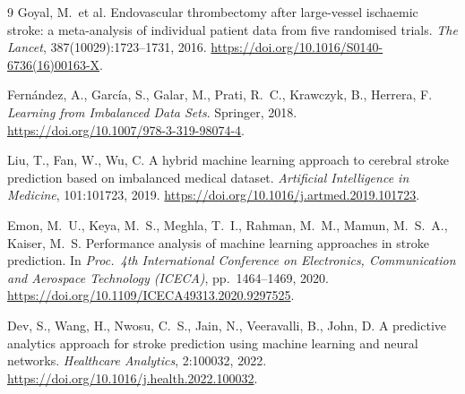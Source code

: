 \documentclass[pdflatex,sn-basic,Numbered]{sn-jnl}
\theoremstyle{thmstyleone}
\theoremstyle{thmstyletwo}
\theoremstyle{thmstylethree}
\begin{document}
\begin{thebibliography}{9}
Goyal, M.\ et al.
Endovascular thrombectomy after large-vessel ischaemic stroke: a
meta-analysis of individual patient data from five randomised trials.
\emph{The Lancet}, 387(10029):1723--1731, 2016.
\url{https://doi.org/10.1016/S0140-6736(16)00163-X}.

Fern\'andez, A., Garc\'ia, S., Galar, M., Prati, R.~C., Krawczyk, B.,
Herrera, F.
\emph{Learning from Imbalanced Data Sets}.
Springer, 2018.
\url{https://doi.org/10.1007/978-3-319-98074-4}.

Liu, T., Fan, W., Wu, C.
A hybrid machine learning approach to cerebral stroke prediction based on
imbalanced medical dataset.
\emph{Artificial Intelligence in Medicine}, 101:101723, 2019.
\url{https://doi.org/10.1016/j.artmed.2019.101723}.

Emon, M.~U., Keya, M.~S., Meghla, T.~I., Rahman, M.~M., Mamun, M.~S.~A.,
Kaiser, M.~S.
Performance analysis of machine learning approaches in stroke prediction.
In \emph{Proc.\ 4th International Conference on Electronics,
Communication and Aerospace Technology (ICECA)}, pp.\ 1464--1469, 2020.
\url{https://doi.org/10.1109/ICECA49313.2020.9297525}.

Dev, S., Wang, H., Nwosu, C.~S., Jain, N., Veeravalli, B., John, D.
A predictive analytics approach for stroke prediction using machine
learning and neural networks.
\emph{Healthcare Analytics}, 2:100032, 2022.
\url{https://doi.org/10.1016/j.health.2022.100032}.

\end{thebibliography}
\end{document}
